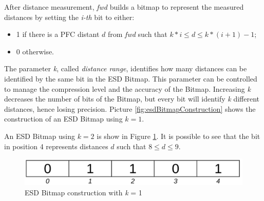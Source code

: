 		After distance measurement, \textit{fwd} builds a bitmap to represent the measured distances by setting the \textit{i-th} bit to either:
		\begin{itemize}
			\item 1 if there is a PFC distant $d$ from \textit{fwd} such that $k * i \leq d \leq k * ( i + 1 ) - 1$;
			\item 0 otherwise.
		\end{itemize} 
		The parameter \textit{k}, called \textit{distance range}, identifies how many distances can be identified by the same bit in the ESD Bitmap. This parameter can be controlled to manage the compression level and the accuracy of the Bitmap. Increasing \textit{k} decreases the number of bits of the Bitmap, but every bit will identify \textit{k} different distances, hence losing precision.
		Picture \ref{fig:esdBitmapConstruction} shows the construction of an ESD Bitmap using $k = 1$.
		
		
		An ESD Bitmap using $k = 2$ is show in Figure \ref{fig:esdBitmapConstructionK2}. It is possible to see that the bit in position 4 represents distances $d$ such that $8 \leq d \leq 9$. 
		
		\begin{figure}[H]
			\centering
			\includegraphics[width=\textwidth]{immagini/esdBitmapConstructionK2}
			\caption{ESD Bitmap construction with \textit{k} = 1}
			\label{fig:esdBitmapConstructionK2}
		\end{figure}
	
		
		
		
		
	